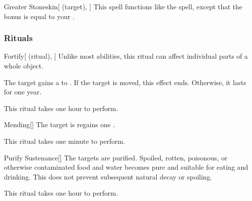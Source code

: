 \lowercase{\hypertarget{spell:Greater Stoneskin}{}}\label{spell:Greater Stoneskin}
\begin{attuneability}[Rank 8]{\hypertarget{spell:Greater Stoneskin}{Greater Stoneskin}}[ (target), ]
This spell functions like the  spell, except that the bonus is equal to your .
\end{attuneability}
\vspace{0.25em}



\subsubsection{Rituals}


\lowercase{\hypertarget{spell:Fortify}{}}\label{spell:Fortify}
\begin{attuneability}[Rank 1]{\hypertarget{spell:Fortify}{Fortify}}[ (ritual), ]
Unlike most abilities, this ritual can affect individual parts of a whole object.

The target gains a   to .
If the target is moved, this effect ends.
Otherwise, it lasts for one year.

This ritual takes one hour to perform.
\end{attuneability}
\vspace{0.25em}



\lowercase{\hypertarget{spell:Mending}{}}\label{spell:Mending}
\begin{apability}[Rank 1]{\hypertarget{spell:Mending}{Mending}}[]
The target is regains one .

This ritual takes one minute to perform.
\end{apability}
\vspace{0.25em}



\lowercase{\hypertarget{spell:Purify Sustenance}{}}\label{spell:Purify Sustenance}
\begin{apability}[Rank 1]{\hypertarget{spell:Purify Sustenance}{Purify Sustenance}}[]
The targets are purified.
Spoiled, rotten, poisonous, or otherwise contaminated food and water becomes pure and suitable for eating and drinking.
This does not prevent subsequent natural decay or spoiling.

This ritual takes one hour to perform.
\end{apability}
\vspace{0.25em}



